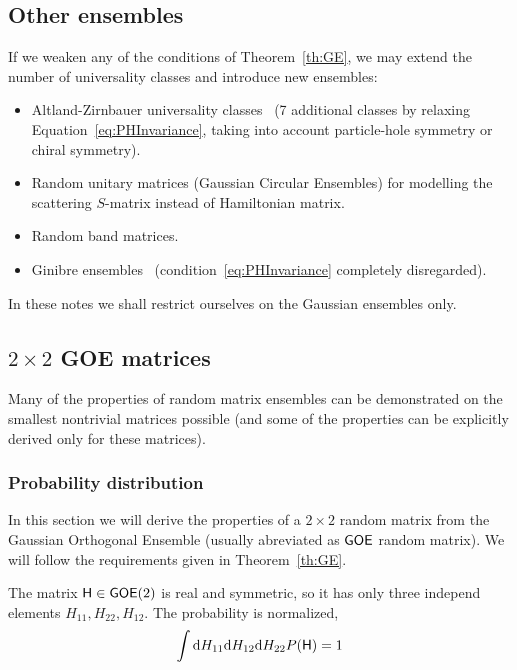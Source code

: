 \documentclass[a4paper,11pt,twoside]{article}
\begin{document}
    \subsection{Other ensembles}
    If we weaken any of the conditions of Theorem~\ref{th:GE}, we may extend the number of universality classes and introduce new ensembles:
    \begin{itemize}
        \item Altland-Zirnbauer universality classes~\cite{Alt97} (7 additional classes by relaxing Equation~\eqref{eq:PHInvariance}, taking into account particle-hole symmetry or chiral symmetry).
        \item Random unitary matrices (Gaussian Circular Ensembles) for modelling the scattering $S$-matrix instead of Hamiltonian matrix.
        \item Random band matrices.
        \item Ginibre ensembles~\cite{Gin65} (condition~\eqref{eq:PHInvariance} completely disregarded).
    \end{itemize} 
    In these notes we shall restrict ourselves on the Gaussian ensembles only.

    \subsection{$2\times2$ GOE matrices}\label{sec:NNSD22}
        Many of the properties of random matrix ensembles can be demonstrated on the smallest nontrivial matrices possible (and some of the properties can be explicitly derived only for these matrices).

        \subsubsection{Probability distribution}
            In this section we will derive the properties of a $2\times2$ random matrix from the Gaussian Orthogonal Ensemble (usually abreviated as $\mathsf{GOE}$ random matrix).
            We will follow the requirements given in Theorem~\ref{th:GE}.

            The matrix $\mathsf{H}\in\mathsf{GOE}(2)$ is real and symmetric, so it has only three independ elements $H_{11},H_{22},H_{12}$.
            The probability is normalized,
            \begin{equation}\label{eq:Hnorm}
                \int\mathrm{d} H_{11}\mathrm{d} H_{12}\mathrm{d} H_{22}P(\mathsf{H})=1
            \end{equation}
\end{document}
